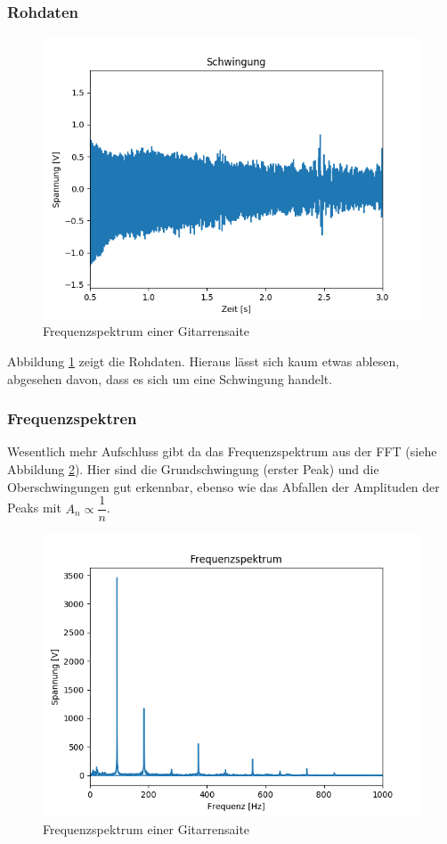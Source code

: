 \documentclass[12pt,a4paper]{article}
\begin{document}
\subsubsection{Rohdaten}
\begin{figure}
\includegraphics[scale=0.9]{Bilder/Gitarre_Schwingung.png}
\centering
\caption{Frequenzspektrum einer Gitarrensaite}
\label{Schwingung_Rohdaten}
\end{figure}
Abbildung \ref{Schwingung_Rohdaten} zeigt die Rohdaten. Hieraus lässt sich kaum etwas ablesen, abgesehen davon, dass es sich um eine Schwingung handelt.
\subsubsection{Frequenzspektren}
Wesentlich mehr Aufschluss gibt da das Frequenzspektrum aus der FFT (siehe Abbildung \ref{Saite_Frequenzspektrum}). Hier sind die Grundschwingung (erster Peak) und die Oberschwingungen gut erkennbar, ebenso wie das Abfallen der Amplituden der Peaks mit $A_n \propto \dfrac{1}{n}$.
\begin{figure}
\includegraphics[scale=0.9]{Bilder/FrequenzspektrumGitarrensaite.png}
\centering
\caption{Frequenzspektrum einer Gitarrensaite}
\label{Saite_Frequenzspektrum}
\end{figure}
\end{document}
